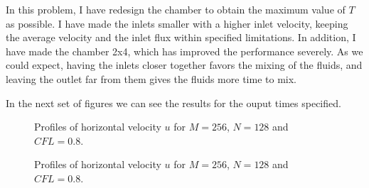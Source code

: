 In this problem, I have redesign the chamber to obtain the maximum value of $T$ as possible. I have made the inlets smaller with a higher inlet velocity, keeping the average velocity and the inlet flux within specified limitations. In addition, I have made the chamber 2x4, which has improved the performance severely. As we could expect, having the inlets closer together favors the mixing of the fluids, and leaving the outlet far from them gives the fluids more time to mix. 

In the next set of figures we can see the results for the ouput times specified.

\begin{figure}[H]
\centering     %
\hspace*{\fill}
\hfill
{}
\hspace*{\fill}

\hspace*{\fill}
\hfill
{}
\hspace*{\fill}

\hspace*{\fill}
\hfill
{}
\hspace*{\fill}

\caption{Profiles of horizontal velocity $u$ for $M=256$, $N=128$ and $CFL=0.8$.}
\end{figure}

\begin{figure}[H]
\centering     %
\hspace*{\fill}
\hfill
{}
\hspace*{\fill}

\hspace*{\fill}
\hfill
{}
\hspace*{\fill}

\hspace*{\fill}
\hfill
{}
\hspace*{\fill}

\caption{Profiles of horizontal velocity $u$ for $M=256$, $N=128$ and $CFL=0.8$.}
\end{figure}


